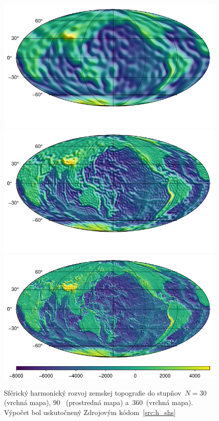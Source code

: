 \documentclass[a4paper, 12pt]{book}
\begin{document}
\begin{figure}
\centering
\includegraphics{./fig-h-shs-nmax30.pdf}
\includegraphics{./fig-h-shs-nmax90.pdf}
\includegraphics{./fig-h-shs-nmax360.pdf}
\caption{Sférický harmonický rozvoj zemskej topografie do stupňov~$N = 30$
(vrchná mapa), $90$~ (prostredná mapa) a~$360$~(vrchná mapa).  Výpočet bol
uskutočnený Zdrojovým kódom~\ref{src:h_shs}}
\label{fig:shs_h}
\end{figure}
\end{document}
